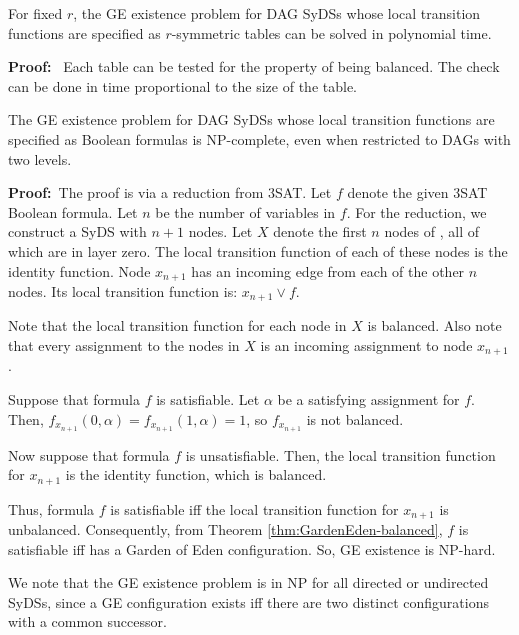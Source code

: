 \smallskip
\begin{theorem}\label{thm:GardenEden-r_symmetric}
For fixed $r$, the GE existence problem for DAG SyDSs
whose local transition functions are specified as $r$-symmetric tables
can be solved in polynomial time.
\end{theorem}
\noindent
\textbf{Proof:}~
Each table can be tested for the property of being balanced.
The check can be done  in time proportional to the size of the table.
\QED

\smallskip
\begin{theorem}\label{thm:GardenEden-NP}
The GE existence problem for DAG SyDSs
whose local transition functions are specified as Boolean formulas
is NP-complete,
even when restricted to DAGs with two levels.
\end{theorem}
\noindent
\textbf{Proof:}~The proof is via a reduction from 3SAT.
Let $f$ denote the given 3SAT Boolean formula.
Let $n$ be the number of variables in $f$.
For the reduction, we construct a SyDS \cals{} with $n+1$ nodes.
Let $X$ denote the first $n$ nodes of \cals{}, all of which are in layer zero.
The local transition function of each of these nodes is the identity function.
Node $x_{n+1}$ has an incoming edge from each of the other $n$  nodes.
Its local transition function is:  $x_{n+1} \vee f$.

Note that the local transition function for each node in $X$ is balanced.
Also note that every assignment to the nodes in $X$ 
is an incoming assignment to node $x_{n+1}$.

Suppose that formula $f$ is satisfiable. 
Let $\alpha$ be a satisfying assignment for $f$.
Then, $f_{x_{n+1}}(0,\alpha) = f_{x_{n+1}}(1,\alpha) = 1$, so $f_{x_{n+1}}$ is not balanced.

Now suppose that formula $f$ is unsatisfiable. 
Then, the local transition function for $x_{n+1}$ is the identity function, which is balanced.

Thus, formula $f$ is satisfiable iff the local transition function for $x_{n+1}$ is unbalanced.
Consequently, from Theorem \ref{thm:GardenEden-balanced},
 $f$ is satisfiable iff  \cals{} has a Garden of Eden configuration.
So, GE existence is NP-hard.

We note that the GE existence problem is in NP for all directed or undirected SyDSs,
since a GE configuration exists iff there are two distinct configurations with a common successor.
\QED
